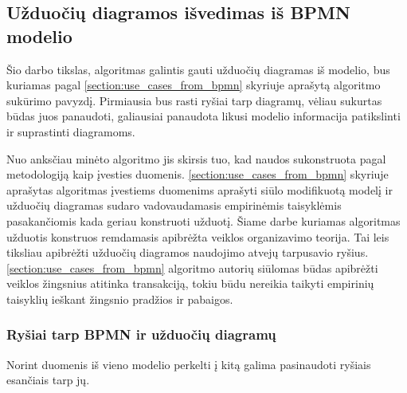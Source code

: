 \subsection{Užduočių diagramos išvedimas iš BPMN modelio}

Šio darbo tikslas, algoritmas galintis gauti užduočių diagramas iš \BPMN{} modelio, bus kuriamas pagal \ref{section:use_cases_from_bpmn} skyriuje aprašytą algoritmo sukūrimo pavyzdį. Pirmiausia bus rasti ryšiai tarp diagramų, vėliau sukurtas būdas juos panaudoti, galiausiai panaudota likusi modelio informacija patikslinti ir suprastinti diagramoms.

Nuo anksčiau minėto algoritmo jis skirsis tuo, kad naudos \BPMN{} sukonstruota pagal \DVCM{} metodologiją kaip įvesties duomenis.  \ref{section:use_cases_from_bpmn} skyriuje aprašytas algoritmas įvestiems duomenims aprašyti siūlo modifikuotą \BPMN{} modelį ir užduočių diagramas sudaro vadovaudamasis empirinėmis taisyklėmis pasakančiomis kada geriau konstruoti užduotį. Šiame darbe kuriamas algoritmas užduotis konstruos remdamasis \DVCM{} apibrėžta veiklos organizavimo teorija. Tai leis tiksliau apibrėžti užduočių diagramos naudojimo atvejų tarpusavio ryšius. \ref{section:use_cases_from_bpmn} algoritmo autorių siūlomas būdas apibrėžti veiklos žingsnius atitinka \DVCM{} transakciją, tokiu būdu nereikia taikyti empirinių taisyklių ieškant žingsnio pradžios ir pabaigos.

\subsubsection{Ryšiai tarp BPMN ir užduočių diagramų} \label{section:relations_sd_bpmn}

Norint duomenis iš vieno modelio perkelti į kitą galima pasinaudoti ryšiais esančiais tarp jų.

